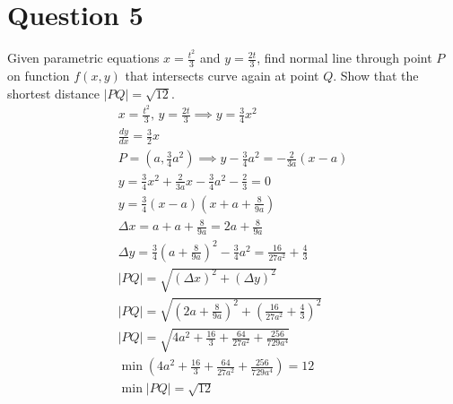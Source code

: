 \documentclass[12pt]{article}
\newcommand{\dydx}{\frac{dy}{dx}}
\begin{document}
\section{Question 5}
Given parametric equations $x=\frac{t^2}{3}$ and $y=\frac{2t}{3}$, find normal line through point $P$ on function $f(x,y)$ that intersects curve again at point $Q$. Show that the shortest distance $|PQ|=\sqrt{12}$.
\begin{gather*}
    x=\frac{t^2}{3}, \, y=\frac{2t}{3} \implies y=\frac{3}{4}x^2\\
    \dydx=\frac{3}{2}x\\
    P=(a,\frac{3}{4}a^2) \implies y-\frac{3}{4}a^2=-\frac{2}{3a}(x-a)\\
    y=\frac{3}{4}x^2+\frac{2}{3a}x-\frac{3}{4}a^2-\frac{2}{3}=0\\
    y=\frac{3}{4}(x-a)(x+a+\frac{8}{9a})\\
    \Delta x=a+a+\frac{8}{9a}=2a+\frac{8}{9a}\\
    \Delta y=\frac{3}{4}(a+\frac{8}{9a})^2-\frac{3}{4}a^2=\frac{16}{27a^2}+\frac{4}{3}\\
    |PQ|=\sqrt{(\Delta x)^2+(\Delta y)^2}\\
    |PQ|=\sqrt{(2a+\frac{8}{9a})^2+(\frac{16}{27a^2}+\frac{4}{3})^2}\\
    |PQ|=\sqrt{4a^2+\frac{16}{3}+\frac{64}{27a^2}+\frac{256}{729a^4}}\\
    \min (4a^2+\frac{16}{3}+\frac{64}{27a^2}+\frac{256}{729a^4})=12\\
    \boxed{\min |PQ|=\sqrt{12}}
\end{gather*}
\end{document}
